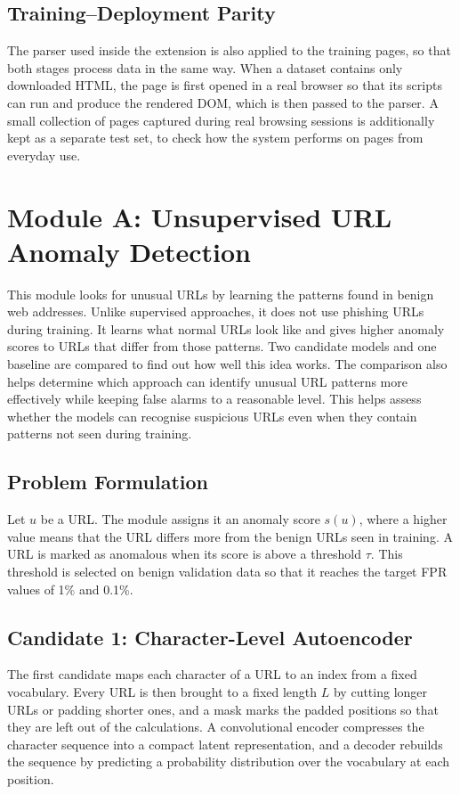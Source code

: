 \documentclass{FastFyp}
\begin{document}
\subsection{Training--Deployment Parity}
\label{sec:parity}
The parser used inside the extension is also applied to the training pages, so that both stages process data in the same way. When a dataset contains only downloaded HTML, the page is first opened in a real browser so that its scripts can run and produce the rendered DOM, which is then passed to the parser. A small collection of pages captured during real browsing sessions is additionally kept as a separate test set, to check how the system performs on pages from everyday use.

\section{Module A: Unsupervised URL Anomaly Detection}
\label{sec:url-module}
This module looks for unusual URLs by learning the patterns found in benign web addresses. Unlike supervised approaches, it does not use phishing URLs during training. It learns what normal URLs look like and gives higher anomaly scores to URLs that differ from those patterns. Two candidate models and one baseline are compared to find out how well this idea works. The comparison also helps determine which approach can identify unusual URL patterns more effectively while keeping false alarms to a reasonable level. This helps assess whether the models can recognise suspicious URLs even when they contain patterns not seen during training.

\subsection{Problem Formulation}
Let $u$ be a URL. The module assigns it an anomaly score $s(u)$, where a higher value means that the URL differs more from the benign URLs seen in training. A URL is marked as anomalous when its score is above a threshold $\tau$. This threshold is selected on benign validation data so that it reaches the target FPR values of 1\% and 0.1\%.

\subsection{Candidate 1: Character-Level Autoencoder}
The first candidate maps each character of a URL to an index from a fixed vocabulary. Every URL is then brought to a fixed length $L$ by cutting longer URLs or padding shorter ones, and a mask marks the padded positions so that they are left out of the calculations. A convolutional encoder compresses the character sequence into a compact latent representation, and a decoder rebuilds the sequence by predicting a probability distribution over the vocabulary at each position.
\end{document}
